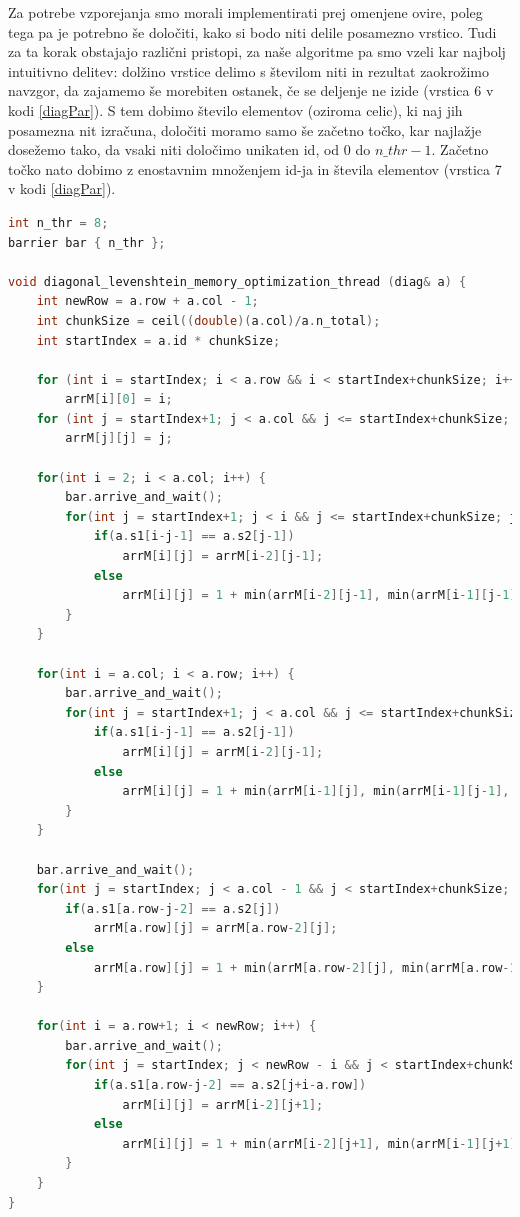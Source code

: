 \documentclass[a4paper,12pt,openright]{book}
\begin{document}
Za potrebe vzporejanja smo morali implementirati prej omenjene ovire, poleg tega pa je potrebno še določiti, kako si bodo niti delile posamezno vrstico. Tudi za ta korak obstajajo različni pristopi, za naše algoritme pa smo vzeli kar najbolj intuitivno delitev: dolžino vrstice delimo s številom niti in rezultat zaokrožimo navzgor, da zajamemo še morebiten ostanek, če se deljenje ne izide (vrstica 6 v kodi \ref{diagPar}). S tem dobimo število elementov (oziroma celic), ki naj jih posamezna nit izračuna, določiti moramo samo še začetno točko, kar najlažje dosežemo tako, da vsaki niti določimo unikaten id, od 0 do $n\_thr-1$. Začetno točko nato dobimo z enostavnim množenjem id-ja in števila elementov (vrstica 7 v kodi \ref{diagPar}). 

\bigskip
\bigskip

\begin{lstlisting}[language=C++, caption={Vzporedni diagonalni algoritem za računanje Levenshteinove razdalje}, captionpos=b, label=diagPar]
int n_thr = 8;
barrier bar { n_thr };

void diagonal_levenshtein_memory_optimization_thread (diag& a) {
    int newRow = a.row + a.col - 1;
    int chunkSize = ceil((double)(a.col)/a.n_total);
    int startIndex = a.id * chunkSize;

    for (int i = startIndex; i < a.row && i < startIndex+chunkSize; i++)
        arrM[i][0] = i;
    for (int j = startIndex+1; j < a.col && j <= startIndex+chunkSize; j++)
        arrM[j][j] = j;

    for(int i = 2; i < a.col; i++) {
        bar.arrive_and_wait();
        for(int j = startIndex+1; j < i && j <= startIndex+chunkSize; j++) {
            if(a.s1[i-j-1] == a.s2[j-1])
                arrM[i][j] = arrM[i-2][j-1];
            else
                arrM[i][j] = 1 + min(arrM[i-2][j-1], min(arrM[i-1][j-1], arrM[i-1][j]));
        }
    }

    for(int i = a.col; i < a.row; i++) {
        bar.arrive_and_wait();
        for(int j = startIndex+1; j < a.col && j <= startIndex+chunkSize; j++) {
            if(a.s1[i-j-1] == a.s2[j-1])
                arrM[i][j] = arrM[i-2][j-1];
            else
                arrM[i][j] = 1 + min(arrM[i-1][j], min(arrM[i-1][j-1], arrM[i-2][j-1]));
        }
    }

    bar.arrive_and_wait();
    for(int j = startIndex; j < a.col - 1 && j < startIndex+chunkSize; j++) {
        if(a.s1[a.row-j-2] == a.s2[j])
            arrM[a.row][j] = arrM[a.row-2][j];
        else
            arrM[a.row][j] = 1 + min(arrM[a.row-2][j], min(arrM[a.row-1][j+1], arrM[a.row-1][j]));
    }
    
    for(int i = a.row+1; i < newRow; i++) {
        bar.arrive_and_wait();
        for(int j = startIndex; j < newRow - i && j < startIndex+chunkSize; j++) {
            if(a.s1[a.row-j-2] == a.s2[j+i-a.row])
                arrM[i][j] = arrM[i-2][j+1];
            else
                arrM[i][j] = 1 + min(arrM[i-2][j+1], min(arrM[i-1][j+1], arrM[i-1][j]));
        }
    }
}
        \end{lstlisting}
\end{document}
